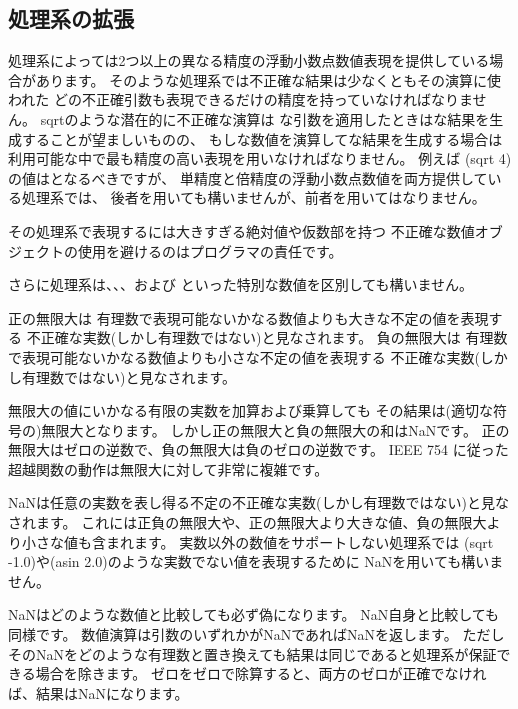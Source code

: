 \subsection{処理系の拡張}

\vest 処理系によっては2つ以上の異なる精度の浮動小数点数値表現を提供している場合があります。
そのような処理系では不正確な結果は少なくともその演算に使われた
どの不正確引数も表現できるだけの精度を持っていなければなりません。
{\cf sqrt}のような潜在的に不正確な演算は
な引数を適用したときはな結果を生成することが望ましいものの、
もしな数値を演算してな結果を生成する場合は
利用可能な中で最も精度の高い表現を用いなければなりません。
例えば {\cf (sqrt 4)} の値は{}となるべきですが、
単精度と倍精度の浮動小数点数値を両方提供している処理系では、
後者を用いても構いませんが、前者を用いてはなりません。

その処理系で表現するには大きすぎる絶対値や仮数部を持つ
不正確な数値オブジェクトの使用を避けるのはプログラマの責任です。

さらに処理系は、、、および
といった特別な数値を区別しても構いません。

正の無限大は
有理数で表現可能ないかなる数値よりも大きな不定の値を表現する
不正確な実数(しかし有理数ではない)と見なされます。
負の無限大は
有理数で表現可能ないかなる数値よりも小さな不定の値を表現する
不正確な実数(しかし有理数ではない)と見なされます。

無限大の値にいかなる有限の実数を加算および乗算しても
その結果は(適切な符号の)無限大となります。
しかし正の無限大と負の無限大の和はNaNです。
正の無限大はゼロの逆数で、負の無限大は負のゼロの逆数です。
IEEE 754 に従った超越関数の動作は無限大に対して非常に複雑です。

NaNは任意の実数を表し得る不定の不正確な実数(しかし有理数ではない)と見なされます。
これには正負の無限大や、正の無限大より大きな値、負の無限大より小さな値も含まれます。
実数以外の数値をサポートしない処理系では
{\cf (sqrt -1.0)}や{\cf (asin 2.0)}のような実数でない値を表現するために
NaNを用いても構いません。

NaNはどのような数値と比較しても必ず偽になります。
NaN自身と比較しても同様です。
数値演算は引数のいずれかがNaNであればNaNを返します。
ただしそのNaNをどのような有理数と置き換えても結果は同じであると処理系が保証できる場合を除きます。
ゼロをゼロで除算すると、両方のゼロが正確でなければ、結果はNaNになります。


